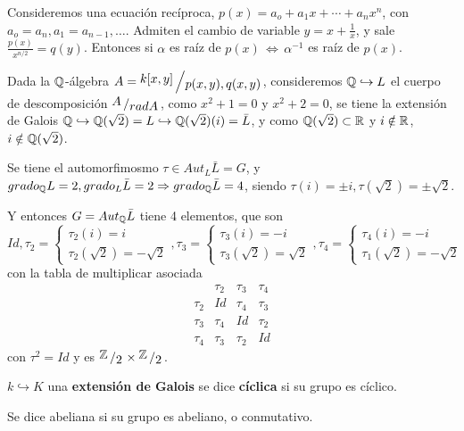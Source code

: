 \begin{ejem}
    Consideremos una ecuaci\'on rec\'iproca, $p(x) = a_o + a_1 x+\cdots + a_n x^n$, con $a_o = a_n, a_1 = a_{n-1}, \ldots$. Admiten el cambio de variable $y=x+\frac{1}{x}$, y sale $\frac{p(x)}{x^{n/2}} = q(y)$. Entonces si $\alpha$ es ra\'iz de $p(x) \, \iff \, \alpha^{-1}$ es ra\'iz de $p(x)$. 
\end{ejem}
\begin{ejem}
    Dada la $\mathbb{Q}$-\'algebra $A = \modulo{k[x,y]}{p(x,y),q(x,y)}$, consideremos $\mathbb{Q} \hookrightarrow L$ el cuerpo de descomposici\'on $\modulo{A}{rad A}$, como $x^2+1 = 0$ y $x^2+2=0$, se tiene la extensi\'on de Galois $\mathbb{Q} \hookrightarrow \mathbb{Q}(\sqrt{2}) = L \hookrightarrow \mathbb{Q}(\sqrt{2})(i) = \bar L$, y como $\mathbb{Q}(\sqrt{2})\subset \mathbb{R}$ y $i\notin \mathbb{R}$, $i\notin \mathbb{Q}(\sqrt{2})$.

    Se tiene el automorfimosmo $\tau \in Aut_L \bar L = G$, y $grado_{\mathbb{Q}} L = 2, grado_{L} \bar L=2\Rightarrow grado_{\mathbb{Q}} \bar L =4$, siendo $\tau (i) = \pm i, \tau (\sqrt{2}) = \pm \sqrt{2}$.
    
    Y entonces $G = Aut_{\mathbb{Q}} \bar L$ tiene 4 elementos, que son 
    $$Id, \tau_2 = \begin{cases}
        \tau_2(i) = i \\ \tau_2(\sqrt{2}) = -\sqrt{2}
    \end{cases}, \tau_3 = \begin{cases}
        \tau_3(i) = -i \\ \tau_3(\sqrt{2}) = \sqrt{2}
    \end{cases}, \tau_4 = \begin{cases}
        \tau_4(i) = -i \\ \tau_1(\sqrt{2}) = -\sqrt{2}
    \end{cases}$$
    con la tabla de multiplicar asociada
    $$\begin{array}{c|c|c|c}
        & \tau_2 & \tau_3 & \tau_4 \\ \hline 
        \tau_2 & Id & \tau_4 & \tau_3 \\\hline 
        \tau_3 & \tau_4 & Id & \tau_2 \\\hline \tau_4 & \tau_3 & \tau_2 & Id 
    \end{array}$$
    con $\tau^2 =Id$ y es $\modulo{\bb Z}{2}\times \modulo{\bb Z}{2}$. 
\end{ejem}


\begin{defi}
 $k \hookrightarrow K$ una \textbf{extensi\'on de Galois} se dice \textbf{c\'iclica} si su grupo es c\'iclico. 

 Se dice abeliana si su grupo es abeliano, o conmutativo.
\end{defi}

